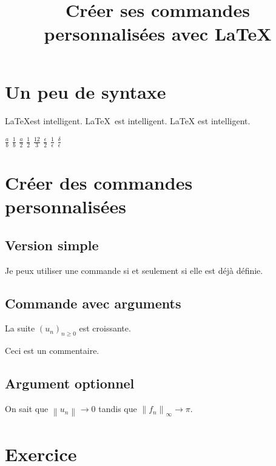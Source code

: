 \documentclass[a4paper, 11pt]{article}
\title{Créer ses commandes personnalisées avec LaTeX}
\begin{document}
\maketitle

    \section{Un peu de syntaxe}

        \LaTeX est intelligent. \LaTeX\ est intelligent. \LaTeX{} est intelligent.

        $\frac{a}{b}$ $\frac1b$ $\frac{a}2$ $\frac12$ $\frac{12}3$ $\frac\epsilon2$ $\frac1\epsilon$ $\frac\delta\epsilon$

    \section{Créer des commandes personnalisées}

        \subsection{Version simple}

            \newcommand{\ssi}{si et seulement si }
            Je peux utiliser une commande \ssi elle est déjà définie.

        \subsection{Commande avec arguments}

            \newcommand{\suite}[3]{\left({#1}_{#2}\right)_{#2#3}}
            La suite $\suite{u}{n}{\geq0}$ est croissante.

            \newcommand{\comm}[1]{}
            Ceci \comm{n'apparaitra pas dans le texte car c'}est un commentaire.

        \subsection{Argument optionnel}

            \newcommand{\norme}[2][{}]{\left\lVert #2 \right\rVert_{#1}}
            On sait que $\norme{u_n}\rightarrow 0$ tandis que $\norme[\infty]{f_n}\rightarrow\pi$.

    \section{Exercice}
\end{document}
